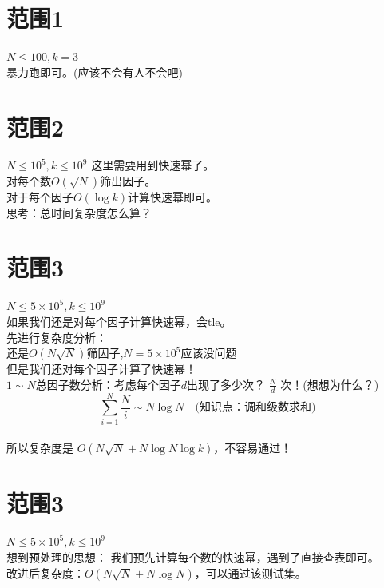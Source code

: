 \documentclass[11pt]{beamer}
\begin{document}
\section{范围1}
\begin{frame}
$N \leq 100, k = 3$ \\
暴力跑即可。(应该不会有人不会吧)
\end{frame}

\section{范围2}
\begin{frame}
$N \leq 10^5, k \leq 10^9$
这里需要用到快速幂了。\\
对每个数$O(\sqrt N)$筛出因子。\\
对于每个因子$O(\log k)$计算快速幂即可。\\
思考：总时间复杂度怎么算？
\end{frame}

\section{范围3}
\begin{frame}
$N \leq 5\times 10^5, k \leq 10^9$\\
如果我们还是对每个因子计算快速幂，会tle。\\
先进行复杂度分析：\\
还是$O(N \sqrt{N})$筛因子,$N = 5\times 10^5$应该没问题\\
但是我们还对每个因子计算了快速幂！\\
$1 \sim N$总因子数分析：考虑每个因子$d$出现了多少次？ $\frac{N}{d}$ 次！(想想为什么？)\\
$$\sum_{i = 1}^N \frac{N}{i} \sim N \log N \quad \text{(知识点：调和级数求和)}$$ \\
所以复杂度是 $O(N \sqrt{N} + N\log N\log k)$，不容易通过！
\end{frame}

\section{范围3}
\begin{frame}
$N \leq 5\times 10^5, k \leq 10^9$\\
想到预处理的思想： 我们预先计算每个数的快速幂，遇到了直接查表即可。\\
改进后复杂度：$O(N \sqrt{N} + N\log N)$，可以通过该测试集。\\
\end{frame}
\end{document}
